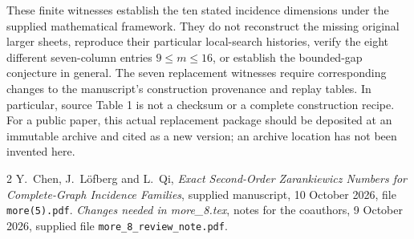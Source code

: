 \documentclass[11pt]{article}
\begin{document}
These finite witnesses establish the ten stated incidence dimensions under
the supplied mathematical framework. They do not reconstruct the missing
original larger sheets, reproduce their particular local-search histories,
verify the eight different seven-column entries $9\le m\le16$, or establish
the bounded-gap conjecture in general. The seven replacement witnesses
require corresponding changes to the manuscript's construction provenance
and replay tables. In particular, source Table 1 is not a checksum or a
complete construction recipe. For a public paper, this actual replacement
package should be deposited at an immutable archive and cited as a new
version; an archive location has not been invented here.

\begin{thebibliography}{2}
 Y.~Chen, J.~L\"ofberg and L.~Qi,
\emph{Exact Second-Order Zarankiewicz Numbers for Complete-Graph Incidence
Families}, supplied manuscript, 10 October 2026, file \texttt{more(5).pdf}.
 \emph{Changes needed in more\_8.tex}, notes for the coauthors,
9 October 2026, supplied file \texttt{more\_8\_review\_note.pdf}.
\end{thebibliography}
\endgroup
\end{document}
